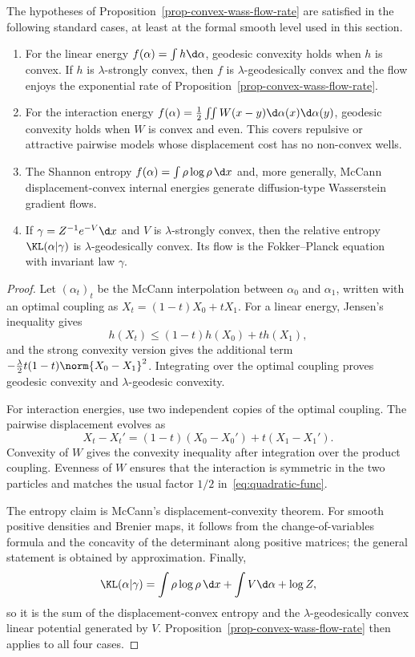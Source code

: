 \begin{prop}\label{prop-convex-flow-examples}
	The hypotheses of Proposition~\ref{prop-convex-wass-flow-rate} are satisfied in the following standard cases, at least at the formal smooth level used in this section.
	\begin{enumerate}
		\item For the linear energy $f(\alpha)=\int h\d\alpha$, geodesic convexity holds when $h$ is convex. If $h$ is $\lambda$-strongly convex, then $f$ is $\lambda$-geodesically convex and the flow enjoys the exponential rate of Proposition~\ref{prop-convex-wass-flow-rate}.
		\item For the interaction energy $f(\alpha)=\frac12\iint W(x-y)\d\alpha(x)\d\alpha(y)$, geodesic convexity holds when $W$ is convex and even. This covers repulsive or attractive pairwise models whose displacement cost has no non-convex wells.
		\item The Shannon entropy $f(\alpha)=\int\rho\log\rho\,\d x$ and, more generally, McCann displacement-convex internal energies generate diffusion-type Wasserstein gradient flows.
		\item If $\gamma=Z^{-1}e^{-V}\d x$ and $V$ is $\lambda$-strongly convex, then the relative entropy $\KL(\alpha|\gamma)$ is $\lambda$-geodesically convex. Its flow is the Fokker--Planck equation with invariant law $\gamma$.
	\end{enumerate}
\end{prop}
\begin{proof}
	Let $(\alpha_t)_t$ be the McCann interpolation between $\alpha_0$ and $\alpha_1$, written with an optimal coupling as $X_t=(1-t)X_0+tX_1$. For a linear energy, Jensen's inequality gives
	\[
		h(X_t)\leq(1-t)h(X_0)+t h(X_1),
	\]
	and the strong convexity version gives the additional term $-\frac{\lambda}{2}t(1-t)\norm{X_0-X_1}^2$. Integrating over the optimal coupling proves geodesic convexity and $\lambda$-geodesic convexity.

	For interaction energies, use two independent copies of the optimal coupling. The pairwise displacement evolves as
	\[
		X_t-X_t'=(1-t)(X_0-X_0')+t(X_1-X_1').
	\]
	Convexity of $W$ gives the convexity inequality after integration over the product coupling. Evenness of $W$ ensures that the interaction is symmetric in the two particles and matches the usual factor $1/2$ in~\eqref{eq:quadratic-func}.

	The entropy claim is McCann's displacement-convexity theorem. For smooth positive densities and Brenier maps, it follows from the change-of-variables formula and the concavity of the determinant along positive matrices; the general statement is obtained by approximation. Finally,
	\[
		\KL(\alpha|\gamma)=\int\rho\log\rho\,\d x+\int V\d\alpha+\log Z,
	\]
	so it is the sum of the displacement-convex entropy and the $\lambda$-geodesically convex linear potential generated by $V$. Proposition~\ref{prop-convex-wass-flow-rate} then applies to all four cases.
\end{proof}

